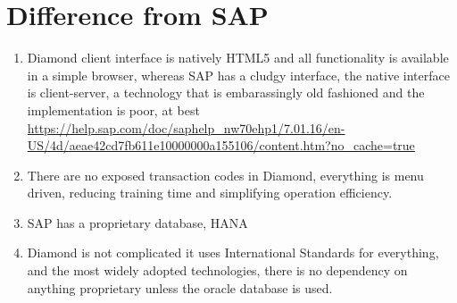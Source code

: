 \documentclass[letterpaper,10pt,english]{sphinxmanual}
\begin{document}
\chapter{Difference from SAP}
\label{BusinessProcessReengineering:difference-from-sap}\begin{enumerate}
\item {} 
Diamond client interface is natively HTML5 and all functionality is
available in a simple browser, whereas SAP has a cludgy interface,
the native interface is client-server, a technology that is
embarassingly old fashioned and the implementation is poor, at best
\href{https://help.sap.com/doc/saphelp\_nw70ehp1/7.01.16/en-US/4d/aeae42cd7fb611e10000000a155106/content.htm?no\_cache=true}{https://help.sap.com/doc/saphelp\_nw70ehp1/7.01.16/en-US/4d/aeae42cd7fb611e10000000a155106/content.htm?no\_cache=true}

\item {} 
There are no exposed transaction codes in Diamond, everything is menu
driven, reducing training time and simplifying operation efficiency.

\item {} 
SAP has a proprietary database, HANA

\item {} 
Diamond is not complicated it uses International Standards for
everything, and the most widely adopted technologies, there is no
dependency on anything proprietary unless the oracle database is
used.

\end{enumerate}
\end{document}
